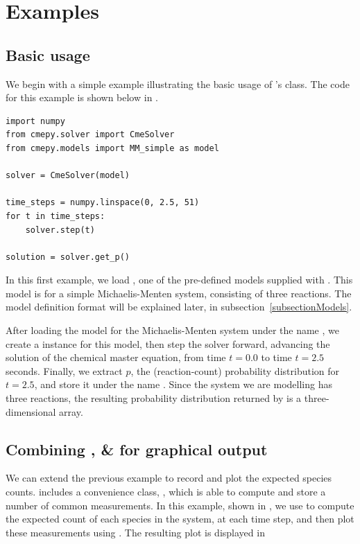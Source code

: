 \section{Examples}

\subsection{Basic  usage}

We begin with a simple example illustrating the basic usage of \cmepy{}'s
 class. The code for this example is shown below in
.

\begin{lstlisting}[frame=tb,
caption={Example: solving a model},
label=basicSolverUsage
]
import numpy
from cmepy.solver import CmeSolver
from cmepy.models import MM_simple as model

solver = CmeSolver(model)

time_steps = numpy.linspace(0, 2.5, 51)
for t in time_steps:
    solver.step(t)

solution = solver.get_p()
\end{lstlisting}

In this first example, we load , one of the pre-defined models
supplied with \cmepy{}. This model is for a simple Michaelis-Menten system,
consisting of three reactions. The model definition format will be explained
later, in subsection~\ref{subsectionModels}.

After loading the model for the Michaelis-Menten system under the name
, we create a  instance for this model, then step
the solver forward, advancing the solution of the chemical master equation,
from time $t = 0.0$ to time $t = 2.5$ seconds. Finally, we extract $p$, the
(reaction-count) probability distribution for $t = 2.5$, and store it under the
name . Since the system we are modelling has three reactions,
the resulting probability distribution returned by  is a
three-dimensional \numpy{} array.

\subsection{Combining ,  \& \pylab{} for
graphical output}

We can extend the previous example to record and plot the expected species
counts. \cmepy{} includes a convenience class, , which is
able to compute and store a number of common measurements. In this example,
shown in , we use  to
compute the expected count of each species in the system, at each time step,
and then plot these measurements using \pylab{}. The resulting plot is
displayed in 

